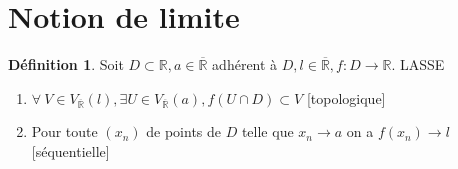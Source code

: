 \documentclass[fleqn]{article}
\theoremstyle{definition} \newtheorem*{defi}{D\'efinition}
\theoremstyle{definition} \newtheorem*{theo}{Th\'eor\`eme}
\theoremstyle{definition} \newtheorem*{adh}{Caract\'erisation s\'equentielle de l'adh\'erence}
\theoremstyle{remark} \newtheorem*{rqs}{Remarques}
\begin{document}
\section{Notion de limite}
\begin{defi}
	Soit $D \subset \mathbb{R}, a \in \overline{\mathbb{R}}$ adh\'erent \`a $D, l \in \overline{\mathbb{R}}, f: D \rightarrow \mathbb{R}$. LASSE
	\begin{enumerate}
		\item $\forall\ V \in V_{\overline{\mathbb{R}}}(l), \exists U \in V_{\overline{\mathbb{R}}}(a), f(U \cap D) \subset V$ [topologique]
		\item Pour toute $(x_n)$ de points de $D$ telle que $x_n \rightarrow a$ on a $f(x_n) \rightarrow l $ [s\'equentielle]
	\end{enumerate}
\end{defi}
$ $ \\
\end{document}
